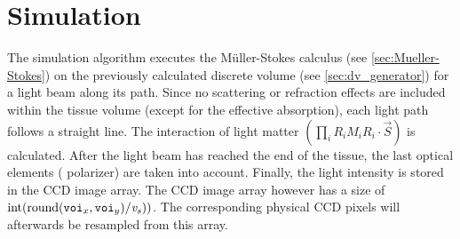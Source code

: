 \section{Simulation}
\label{sec:simulation}
% 
The simulation algorithm executes the M\"uller-Stokes calculus (see \cref{sec:Mueller-Stokes}) on the previously calculated discrete volume (see \cref{sec:dv_generator}) for a light beam along its path.
Since no scattering or refraction effects are included within the tissue volume (except for the effective absorption), each light path follows a straight line.
The interaction of light matter $\left( \prod_i R_i M_i R_i \cdot \vec{S} \right)$ is calculated. 
After the light beam has reached the end of the tissue, the last optical elements (\eg{} polarizer) are taken into account.
Finally, the light intensity is stored in the \acs{CCD} image array.
The \ac{CCD} image array however has a size of $\integer{}(\round((\voi_x,\voi_y)/\voxels))$.
The corresponding physical \ac{CCD} pixels will afterwards be resampled from this array.
\\
%
